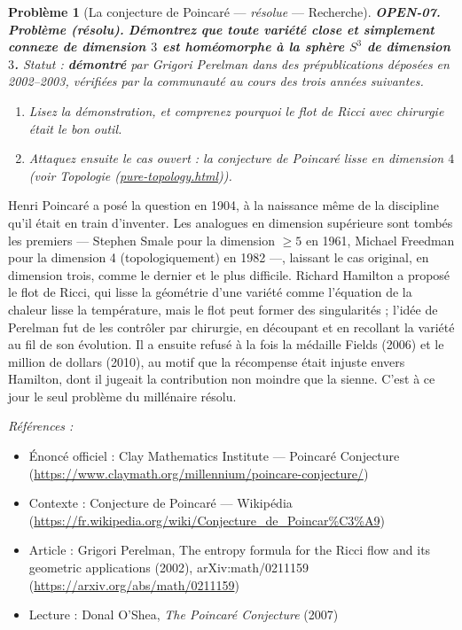 \documentclass[11pt]{article}
\newtheorem{problem}{Problème}
\newenvironment{refs}{\par\small\noindent\emph{Références :}\begin{itemize}\setlength\itemsep{0pt}}{\end{itemize}\normalsize}
\begin{document}
\bigskip

\begin{problem}[{La conjecture de Poincaré --- \textit{résolue} --- Recherche}]
\textbf{OPEN-07.} \textbf{Problème (résolu).} \textbf{Démontrez que toute variété close et simplement connexe de
dimension $ 3 $ est homéomorphe à la sphère $ S^3 $ de dimension $ 3 $.} Statut :
\textbf{démontré} par Grigori Perelman dans des prépublications déposées en 2002--2003,
vérifiées par la communauté au cours des trois années suivantes.
\begin{enumerate}
\item[(a)] Lisez la démonstration, et comprenez pourquoi le flot de Ricci avec chirurgie était le
bon outil.
\item[(b)] Attaquez ensuite le cas ouvert : la conjecture de Poincaré lisse en dimension $ 4 $
(voir Topologie (\url{pure-topology.html})).
\end{enumerate}

\end{problem}

\noindent Henri Poincaré a posé la question en 1904, à la naissance même de la
discipline qu'il était en train d'inventer. Les analogues en dimension supérieure sont
tombés les premiers --- Stephen Smale pour la dimension $ \geq 5 $ en 1961, Michael
Freedman pour la dimension 4 (topologiquement) en 1982 ---, laissant le cas original, en
dimension trois, comme le dernier et le plus difficile. Richard Hamilton a proposé le flot
de Ricci, qui lisse la géométrie d'une variété comme l'équation de la chaleur lisse la
température, mais le flot peut former des singularités ; l'idée de Perelman fut de les
contrôler par chirurgie, en découpant et en recollant la variété au fil de son évolution.
Il a ensuite refusé à la fois la médaille Fields (2006) et le million de dollars (2010),
au motif que la récompense était injuste envers Hamilton, dont il jugeait la contribution
non moindre que la sienne. C'est à ce jour le seul problème du millénaire résolu.

\begin{refs}
\item Énoncé officiel : Clay Mathematics Institute --- Poincaré Conjecture (\url{https://www.claymath.org/millennium/poincare-conjecture/})
\item Contexte : Conjecture de Poincaré --- Wikipédia (\url{https://fr.wikipedia.org/wiki/Conjecture_de_Poincar%C3%A9})
\item Article : Grigori Perelman, \og{} The entropy formula for the Ricci flow and its geometric applications \fg{} (2002), arXiv:math/0211159 (\url{https://arxiv.org/abs/math/0211159})
\item Lecture : Donal O'Shea, \textit{The Poincaré Conjecture} (2007)
\end{refs}
\end{document}
